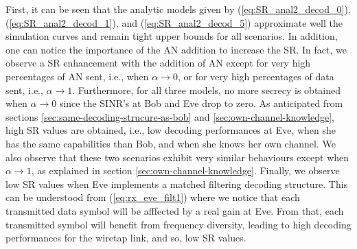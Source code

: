 \documentclass[journal,comsoc]{IEEEtran}
\begin{document}
First, it can be seen that the analytic models given by (\ref{eq:SR_anal2_decod_0}), (\ref{eq:SR_anal2_decod_1}), and (\ref{eq:SR_anal2_decod_5}) approximate well the simulation curves and remain tight upper bounds for all scenarios.  In addition, one can notice the importance of the AN addition to increase the SR. In fact, we observe a SR enhancement with the addition of AN except for very high percentages of AN sent, i.e., when $\alpha \to 0$, or for very high percentages of data sent, i.e., $\alpha \to 1$. Furthermore, for all three models, no more secrecy is obtained when $\alpha \to 0$ since the SINR's at Bob and Eve drop to zero. As anticipated from sections \ref{sec:same-decoding-strucure-as-bob} and \ref{sec:own-channel-knowledge}, high SR values are obtained, i.e., low decoding performances at Eve, when she has the same capabilities than Bob, and when she knows her own channel. We also observe that these two scenarios exhibit very similar behaviours except when $\alpha \to 1$, as explained in section \ref{sec:own-channel-knowledge}. Finally, we observe low SR values when Eve implements a matched filtering decoding structure. This can be understood from (\ref{eq:rx_eve_filt1}) where we notice that each transmitted data symbol will be afffected by a real gain at Eve. From that, each transmitted symbol will benefit from frequency diversity, leading to high decoding performances for the wiretap link, and so, low SR values.   




\end{document}
